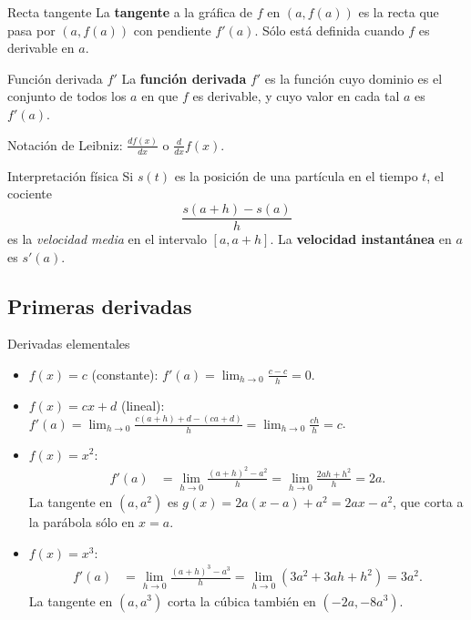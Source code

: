 \documentclass[12pt]{article}
\begin{document}
\begin{definicion}[]{Recta tangente}
La \textbf{tangente} a la gráfica de $f$ en $(a, f(a))$ es la recta que pasa por $(a, f(a))$ con pendiente $f'(a)$. Sólo está definida cuando $f$ es derivable en $a$.
\end{definicion}

\begin{definicion}[]{Función derivada $f'$}
La \textbf{función derivada} $f'$ es la función cuyo dominio es el conjunto de todos los $a$ en que $f$ es derivable, y cuyo valor en cada tal $a$ es $f'(a)$.

Notación de Leibniz: $\displaystyle\frac{df(x)}{dx}$ o $\displaystyle\frac{d}{dx}f(x)$.
\end{definicion}

\begin{nota}[]{Interpretación física}
Si $s(t)$ es la posición de una partícula en el tiempo $t$, el cociente
\[ \frac{s(a+h)-s(a)}{h} \]
es la \textit{velocidad media} en el intervalo $[a, a+h]$. La \textbf{velocidad instantánea} en $a$ es $s'(a)$.
\end{nota}

\subsection{Primeras derivadas}

\begin{observacion}[]{Derivadas elementales}
\begin{itemize}
  \item $f(x) = c$ (constante): $f'(a) = \displaystyle\lim_{h\to 0}\frac{c-c}{h} = 0$.

  \item $f(x) = cx+d$ (lineal): $f'(a) = \displaystyle\lim_{h\to 0}\frac{c(a+h)+d-(ca+d)}{h} = \lim_{h\to 0}\frac{ch}{h} = c$.

  \item $f(x) = x^2$:
  \begin{align*}
    f'(a) &= \lim_{h\to 0}\frac{(a+h)^2-a^2}{h} = \lim_{h\to 0}\frac{2ah+h^2}{h} = 2a.
  \end{align*}
  La tangente en $(a,a^2)$ es $g(x) = 2a(x-a)+a^2 = 2ax-a^2$, que corta a la parábola sólo en $x=a$.

  \item $f(x) = x^3$:
  \begin{align*}
    f'(a) &= \lim_{h\to 0}\frac{(a+h)^3-a^3}{h} = \lim_{h\to 0}(3a^2+3ah+h^2) = 3a^2.
  \end{align*}
  La tangente en $(a,a^3)$ corta la cúbica también en $(-2a,-8a^3)$.
\end{itemize}
\end{observacion}
\end{document}
